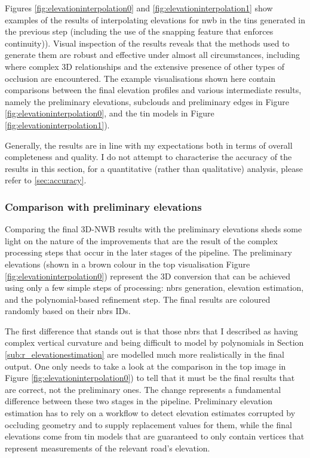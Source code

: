 Figures \ref{fig:elevationinterpolation0} and \ref{fig:elevationinterpolation1} show examples of the results of interpolating elevations for \ac{nwb} in the \ac{tin}s generated in the previous step (including the use of the snapping feature that enforces continuity)). Visual inspection of the results reveals that the methods used to generate them are robust and effective under almost all circumstances, including where complex 3D relationships and the extensive presence of other types of occlusion are encountered. The example visualisations shown here contain comparisons between the final elevation profiles and various intermediate results, namely the preliminary elevations, subclouds and preliminary edges in Figure \ref{fig:elevationinterpolation0}, and the \ac{tin} models in Figure \ref{fig:elevationinterpolation1}).

Generally, the results are in line with my expectations both in terms of overall completeness and quality. I do not attempt to characterise the accuracy of the results in this section, for a quantitative (rather than qualitative) analysis, please refer to \ref{sec:accuracy}.

\subsubsection{Comparison with preliminary elevations}

Comparing the final 3D-NWB results with the preliminary elevations sheds some light on the nature of the improvements that are the result of the complex processing steps that occur in the later stages of the pipeline. The preliminary elevations (shown in a brown colour in the top visualisation Figure \ref{fig:elevationinterpolation0}) represent the 3D conversion that can be achieved using only a few simple steps of processing: \ac{nbrs} generation, elevation estimation, and the polynomial-based refinement step. The final results are coloured randomly based on their \ac{nbrs} IDs.

The first difference that stands out is that those \ac{nbrs} that I described as having complex vertical curvature and being difficult to model by polynomials in Section \ref{sub:r_elevationestimation} are modelled much more realistically in the final output. One only needs to take a look at the comparison in the top image in Figure \ref{fig:elevationinterpolation0}) to tell that it must be the final results that are correct, not the preliminary ones. The change represents a fundamental difference between these two stages in the pipeline. Preliminary elevation estimation has to rely on a workflow to detect elevation estimates corrupted by occluding geometry and to supply replacement values for them, while the final elevations come from \ac{tin} models that are guaranteed to only contain vertices that represent measurements of the relevant road's elevation.

